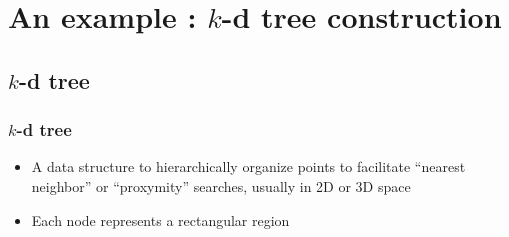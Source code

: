\documentclass[12pt,dvipdfmx]{beamer}
\begin{document}
\section{An example :  $k$-d tree construction}

\subsection{$k$-d tree}

\begin{frame}
\frametitle{$k$-d tree}
\begin{itemize}
\item A data structure to hierarchically organize
  points to facilitate ``nearest neighbor'' or ``proxymity'' searches,
  usually in 2D or 3D space
\item Each node represents a rectangular region
\end{itemize}

\begin{center}
\def\svgwidth{0.5\textwidth}
  
\end{center}
\end{frame}
\end{document}
